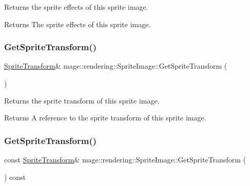 Returns the sprite effects of this sprite image.

\begin{DoxyReturn}{Returns}
The sprite effects of this sprite image. 
\end{DoxyReturn}
\hypertarget{classmage_1_1rendering_1_1_sprite_image_a1f4b344e6c2087c7b68b65a8d719e5ef}{}\label{classmage_1_1rendering_1_1_sprite_image_a1f4b344e6c2087c7b68b65a8d719e5ef} 
\subsubsection{\texorpdfstring{Get\+Sprite\+Transform()}{GetSpriteTransform()}\hspace{0.1cm}{\footnotesize\ttfamily [1/2]}}
{\footnotesize\ttfamily \hyperlink{classmage_1_1_sprite_transform}{Sprite\+Transform}\& mage\+::rendering\+::\+Sprite\+Image\+::\+Get\+Sprite\+Transform (\begin{DoxyParamCaption}{ }\end{DoxyParamCaption})\hspace{0.3cm}{\ttfamily [noexcept]}}

Returns the sprite transform of this sprite image.

\begin{DoxyReturn}{Returns}
A reference to the sprite transform of this sprite image. 
\end{DoxyReturn}
\hypertarget{classmage_1_1rendering_1_1_sprite_image_a4d2fdf5ac9f60ef9bceb54055080a20b}{}\label{classmage_1_1rendering_1_1_sprite_image_a4d2fdf5ac9f60ef9bceb54055080a20b} 
\subsubsection{\texorpdfstring{Get\+Sprite\+Transform()}{GetSpriteTransform()}\hspace{0.1cm}{\footnotesize\ttfamily [2/2]}}
{\footnotesize\ttfamily const \hyperlink{classmage_1_1_sprite_transform}{Sprite\+Transform}\& mage\+::rendering\+::\+Sprite\+Image\+::\+Get\+Sprite\+Transform (\begin{DoxyParamCaption}{ }\end{DoxyParamCaption}) const\hspace{0.3cm}{\ttfamily [noexcept]}}

